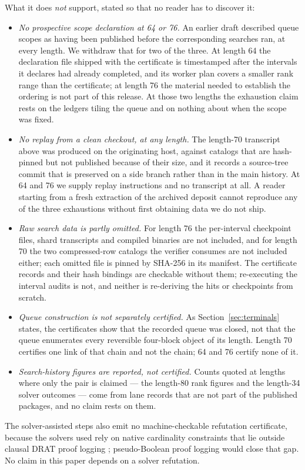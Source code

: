 \documentclass[11pt]{article}
\begin{document}
What it does \emph{not} support, stated so that no reader has to discover it:
\begin{itemize}
  \item \emph{No prospective scope declaration at 64 or 76.} An earlier draft
  described queue scopes as having been published before the corresponding
  searches ran, at every length.  We withdraw that for two of the three.  At
  length 64 the declaration file shipped with the certificate is timestamped
  after the intervals it declares had already completed, and its worker plan
  covers a smaller rank range than the certificate; at length 76 the material
  needed to establish the ordering is not part of this release.  At those two
  lengths the exhaustion claim rests on the ledgers tiling the queue and on
  nothing about when the scope was fixed.
  \item \emph{No replay from a clean checkout, at any length.} The length-70
  transcript above was produced on the originating host, against catalogs that
  are hash-pinned but not published because of their size, and it records a
  source-tree commit that is preserved on a side branch rather than in the main
  history.  At 64 and 76 we supply replay instructions and no transcript at
  all.  A reader starting from a fresh extraction of the archived deposit
  cannot reproduce any of the three exhaustions without
  first obtaining data we do not ship.
  \item \emph{Raw search data is partly omitted.} For length 76 the
  per-interval checkpoint files, shard transcripts and compiled binaries are
  not included, and for length 70 the two compressed-row catalogs the verifier
  consumes are not included either; each omitted file is pinned by SHA-256 in
  its manifest.  The certificate records and their hash bindings are checkable
  without them; re-executing the interval audits is not, and neither is
  re-deriving the hits or checkpoints from scratch.
  \item \emph{Queue construction is not separately certified.} As
  Section~\ref{sec:terminals} states, the certificates show that the recorded
  queue was closed, not that the queue enumerates every reversible four-block
  object of its length.  Length 70 certifies one link of that chain and not the
  chain; 64 and 76 certify none of it.
  \item \emph{Search-history figures are reported, not certified.} Counts
  quoted at lengths where only the pair is claimed --- the length-80 rank
  figures and the length-34 solver outcomes --- come from lane records that
  are not part of the published packages, and no claim rests on them.
\end{itemize}
The solver-assisted steps also emit no machine-checkable refutation
certificate, because the solvers used rely on native cardinality constraints
that lie outside clausal DRAT proof logging \cite{wetzler-heule-hunt-2014};
pseudo-Boolean proof logging \cite{bogaerts-gocht-mccreesh-nordstrom-2022}
would close that gap.  No claim in this paper depends on a solver refutation.
\end{document}
